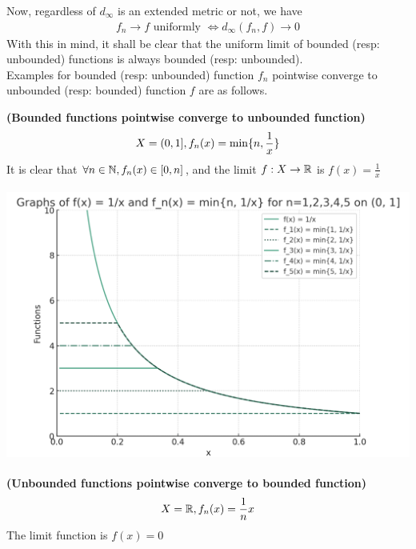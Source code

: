 \documentclass{report}
\begin{document}
\begin{mdframed}
Now, regardless of $d_{\infty}$ is an extended metric or not, we have 
\begin{align*}
f_n\to f\text{ uniformly }\iff d_{\infty}(f_n,f)\to 0
\end{align*}
With this in mind, it shall be clear that the uniform limit of bounded (resp: unbounded) functions is always bounded (resp: unbounded).\\ 

Examples for bounded (resp: unbounded) function $f_n$ pointwise converge to unbounded (resp: bounded) function $f$ are as follows.

\begin{Example}{\textbf{(Bounded functions pointwise converge to unbounded function)}}{}
\label{bfpce}
\begin{align*}
  X=(0,1],f_n(x)=\min  \{ n,\frac{1}{x} \}
\end{align*}
It is clear that $\forall n\in\mathbb{N},f_n(x) \in [0,n]$, and the limit $f:X\rightarrow \mathbb{R}$ is $f(x)=\frac{1}{x}$
\begin{center}
   \begin{minipage}{0.9\linewidth}  
       \centering
\includegraphics[height=9cm,width=15cm]{pwise converge1.png}
   \end{minipage}
\end{center}
\end{Example}
\begin{Example}{\textbf{(Unbounded functions pointwise converge to bounded function)}}{}
\begin{align*}
X=\mathbb{R},f_n(x)=\frac{1}{n}x
\end{align*}
The limit function is $f(x)=0$
\begin{center}
   \begin{minipage}{0.9\linewidth}  

\end{minipage}
\end{center}
\end{Example}
\end{mdframed}
\end{document}
